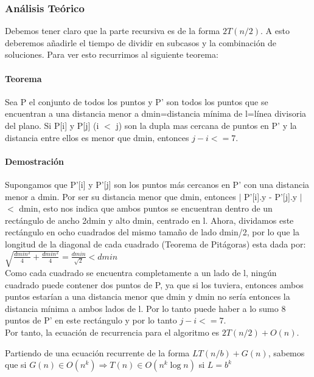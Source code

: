 \documentclass[a4paper,12pt,twoside]{article} %
\begin{document}
\newpage

\subsubsection{Análisis Teórico}


Debemos tener claro que la parte recursiva es de la forma $2T(n/2)$. A esto deberemos añadirle el tiempo de dividir en subcasos y la combinación de soluciones. Para ver esto recurrimos al siguiente teorema:

\paragraph{Teorema}

Sea P el conjunto de todos los puntos y P' son todos los puntos que se encuentran a una distancia menor a dmin=distancia mínima de l=línea divisoria del plano. Si P[i] y P[j] (i $<$ j) son la dupla mas cercana de puntos en P' y la distancia entre ellos es menor que dmin, entonces $j-i <= 7$.

\paragraph{Demostración}

Supongamos que P'[i] y P'[j] son los puntos más cercanos en P' con una distancia menor a dmin. Por ser su distancia menor que dmin, entonces $|$ P'[i].y - P'[j].y $|$ $<$ dmin, esto nos indica que ambos puntos se encuentran dentro de un rectángulo de ancho 2dmin y alto dmin, centrado en l. Ahora, dividamos este rectángulo en ocho cuadrados del mismo tamaño de lado dmin/2, por lo que la longitud de la diagonal de cada cuadrado (Teorema de Pitágoras) esta dada por:\\

$\sqrt{\frac{dmin^2}{4}+\frac{dmin^2}{4}}= \frac{dmin}{\sqrt{2}} < dmin$\\

Como cada cuadrado se encuentra completamente a un lado de l, ningún cuadrado puede contener dos puntos de P, ya que si los tuviera, entonces ambos puntos estarían a una distancia menor que dmin y dmin no sería entonces la distancia mínima a ambos lados de l. Por lo tanto puede haber a lo sumo 8 puntos de P' en este rectángulo y por lo tanto $j-i <= 7$.\\

Por tanto, la ecuación de recurrencia para el algoritmo es $2T(n/2) + O(n)$. 

Partiendo de una ecuación recurrente de la forma $LT(n/b) + G(n)$, sabemos que si $G(n) \in O(n^k) \Rightarrow T(n) \in O(n^k \log{n})$ si 
$L=b^k$
\end{document}
